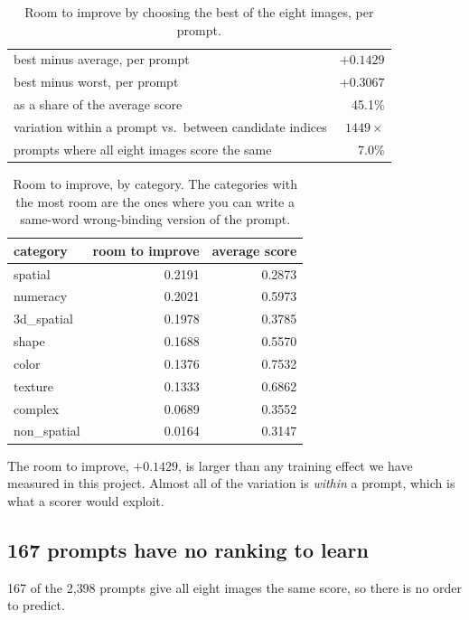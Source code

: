 \documentclass[11pt]{article}
\begin{document}
\begin{table}[h]
\centering
\caption{Room to improve by choosing the best of the eight images, per prompt.}
\begin{tabular}{@{}lr@{}}
\toprule
best minus average, per prompt & \textbf{$+0.1429$} \\
best minus worst, per prompt   & $+0.3067$ \\
as a share of the average score & 45.1\% \\
variation within a prompt vs.\ between candidate indices & $1449\times$ \\
prompts where all eight images score the same & 7.0\% \\
\bottomrule
\end{tabular}
\end{table}

\begin{table}[h]
\centering
\caption{Room to improve, by category. The categories with the most room are the ones where you can
write a same-word wrong-binding version of the prompt.}
\begin{tabular}{@{}lrr@{}}
\toprule
category & room to improve & average score \\
\midrule
spatial      & 0.2191 & 0.2873 \\
numeracy     & 0.2021 & 0.5973 \\
3d\_spatial  & 0.1978 & 0.3785 \\
shape        & 0.1688 & 0.5570 \\
color        & 0.1376 & 0.7532 \\
texture      & 0.1333 & 0.6862 \\
complex      & 0.0689 & 0.3552 \\
non\_spatial & 0.0164 & 0.3147 \\
\bottomrule
\end{tabular}
\end{table}

\noindent
The room to improve, $+0.1429$, is larger than any training effect we have measured in this project.
Almost all of the variation is \emph{within} a prompt, which is what a scorer would exploit.

\subsection{167 prompts have no ranking to learn}

167 of the 2{,}398 prompts give all eight images the same score, so there is no order to predict.
\end{document}
